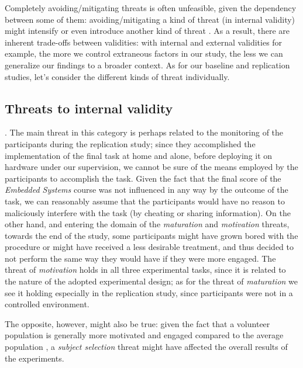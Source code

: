Completely avoiding/mitigating threats is often unfeasible, given the dependency between some of them: avoiding/mitigating a kind of threat (\ie in internal validity) might intensify or even introduce another kind of threat \cite{DBLP:books/sp/WohlinRHOR00}. As a result, there are inherent trade-offs between validities: with internal and external validities for example, the more we control extraneous factors in our study, the less we can generalize our findings to a broader context. As for our baseline and replication studies, let's consider the different kinds of threat individually.

\subsection{Threats to internal validity}.
The main threat in this category is perhaps related to the monitoring of the participants during the replication study; since they accomplished the implementation of the final task at home and alone, before deploying it on hardware under our supervision, we cannot be sure of the means employed by the participants to accomplish the task. Given the fact that the final score of the \textit{Embedded Systems} course was not influenced in any way by the outcome of the task, we can reasonably assume that the participants would have no reason to maliciously interfere with the task (\ie by cheating or sharing information). On the other hand, and entering the domain of the \textit{maturation} and \textit{motivation} threats, towards the end of the study, some participants might have grown bored with the procedure or might have received a less desirable treatment, and thus decided to not perform the same way they would have if they were more engaged. The threat of \textit{motivation} holds in all three experimental tasks, since it is related to the nature of the adopted experimental design; as for the threat of \textit{maturation} we see it holding especially in the replication study, since participants were not in a controlled environment.

The opposite, however, might also be true: given the fact that a volunteer population is generally more motivated and engaged compared to the average population \cite{DBLP:books/sp/WohlinRHOR00}, a \textit{subject selection} threat might have affected the overall results of the experiments.

